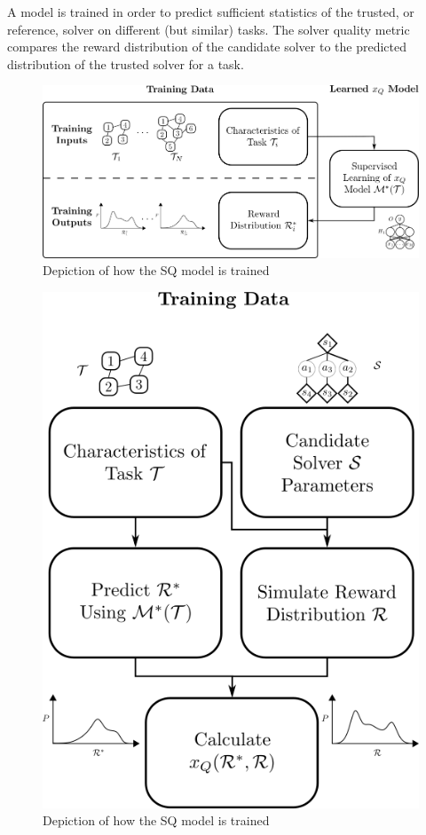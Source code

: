     A model is trained in order to predict sufficient statistics of the trusted, or reference, solver \solvestar{} on different (but similar) tasks. The solver quality metric compares the reward distribution of the candidate solver to the predicted distribution of the trusted solver for a task.

    \begin{figure}[tbp]
        \centering
        \includegraphics[width=0.9\linewidth]{Figures/SQ_train.png}
        \caption{Depiction of how the SQ model is trained}
        \label{fig:sq_train}
    \end{figure}%

    \begin{figure}[tbp]
        \centering
        \includegraphics[width=0.7\linewidth]{Figures/SQ_test.png}
        \caption{Depiction of how the SQ model is trained}
        \label{fig:sq_train}
    \end{figure}

